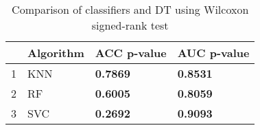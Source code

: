 \begin{table}
\footnotesize
\caption{Comparison of classifiers and DT using Wilcoxon signed-rank test}
\label{tab:wilcoxon comparison}
\begin{tabular}{llll}
\hline
 & Algorithm & ACC p-value & AUC p-value \\
\hline
1 & KNN & \textbf{0.7869} & \textbf{0.8531} \\
2 & RF & \textbf{0.6005} & \textbf{0.8059} \\
3 & SVC & \textbf{0.2692} & \textbf{0.9093} \\
\hline
\end{tabular}
\end{table}
